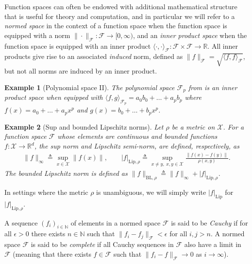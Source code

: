 \documentclass[12pt,paper=letter]{scrreprt}
\newtheorem{example}{Example}[chapter]
\def\defeq{\triangleq} %
\begin{document}
Function spaces can often be endowed with additional mathematical structure that is useful for theory and computation, and in particular we will refer to a \emph{normed space} in the context of a function space when the function space is equipped with a norm $\|\cdot\|_{\mathcal{F}} : \mathcal{F} \rightarrow [0,\infty)$, and an \emph{inner product space} when the function space is equipped with an inner product $\langle \cdot , \cdot \rangle_{\mathcal{F}} : \mathcal{F} \times \mathcal{F} \rightarrow \mathbb{R}$.
All inner products give rise to an associated \emph{induced} norm, defined as $\|f\|_{\mathcal{F}} = \sqrt{\langle f , f \rangle_{\mathcal{F}}}$, but not all norms are induced by an inner product.



\begin{example}[Polynomial space II] \label{ex: inner prod poly}
The polynomial space $\mathcal{F}_p$ from  is an inner product space when equipped with $\langle f , g \rangle_{\mathcal{F}_p} = a_0 b_0 + \dots + a_p b_p$ where $f(x) = a_0 + \dots + a_p x^p$ and $g(x) = b_0 + \dots + b_p x^p$.
\end{example}




\begin{example}[Sup and bounded Lipschitz norms]
\label{ex: bl norm}
    Let $\rho$ be a metric on $\mathcal{X}$.
    For a function space $\mathcal{F}$ whose elements are continuous and bounded functions $f : \mathcal{X} \rightarrow \mathbb{R}^d$, the \emph{sup norm} and \emph{Lipschitz semi-norm}, are defined, respectively, as
    \begin{align*}
        \|f\|_\infty \defeq \sup_{x \in \mathcal{X}} \|f(x)\| , \qquad 
        |f|_{\text{Lip},\rho} \defeq \sup_{x \neq y, \; x,y \in \mathcal{X}} \frac{\|f(x) - f(y)\|}{\rho(x,y)} .
    \end{align*}
The \emph{bounded Lipschitz norm} is defined as $\|f\|_{\text{BL},\rho} \defeq \|f\|_\infty + |f|_{\text{Lip},\rho}$.    
\end{example}

\noindent In settings where the metric $\rho$ is unambiguous, we will simply write $|f|_{\text{Lip}}$ for $|f|_{\text{Lip},\rho}$.

A sequence $(f_i)_{i \in \mathbb{N}}$ of elements in a normed space $\mathcal{F}$ is said to be \emph{Cauchy} if for all $\epsilon > 0$ there exists $n \in \mathbb{N}$ such that $\|f_i - f_j \|_{\mathcal{F}} < \epsilon$ for all $i,j > n$.
A normed space $\mathcal{F}$ is said to be \emph{complete} if all Cauchy sequences in $\mathcal{F}$ also have a limit in $\mathcal{F}$ (meaning that there exists $f \in \mathcal{F}$ such that $\|f_i - f\|_{\mathcal{F}} \rightarrow 0$ as $i \rightarrow \infty$).
\end{document}
